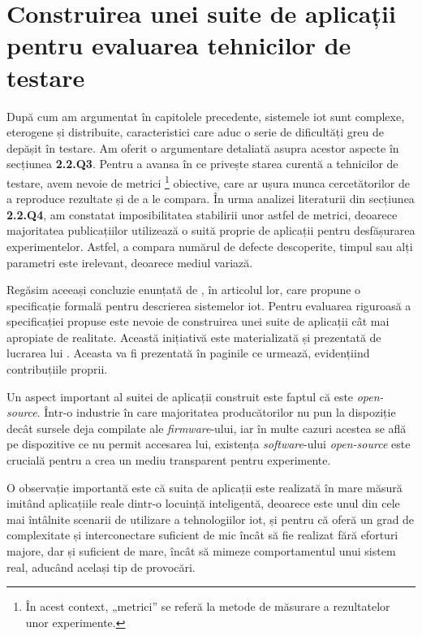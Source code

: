\chapter{Construirea unei suite de aplicații pentru evaluarea 
tehnicilor de testare}

După cum am argumentat în capitolele precedente, sistemele \acrshort{iot} sunt complexe, eterogene și distribuite, caracteristici care aduc o serie de dificultăți greu de depășit în testare. Am oferit o argumentare detaliată asupra acestor aspecte în secțiunea \textbf{2.2.Q3}. Pentru a avansa în ce privește starea curentă a tehnicilor de testare, avem nevoie de metrici \footnote{În acest context, „metrici” se referă la metode de măsurare a rezultatelor unor experimente.} obiective, care ar ușura munca cercetătorilor de a reproduce rezultate și de a le compara. În urma analizei literaturii din secțiunea \textbf{2.2.Q4}, am constatat imposibilitatea stabilirii unor astfel de metrici, deoarece majoritatea publicațiilor utilizează o suită proprie de aplicații pentru desfășurarea experimentelor. Astfel, a compara numărul de defecte descoperite, timpul sau alți parametri este irelevant, deoarece mediul variază. 

Regăsim aceeași concluzie enunțată de \citet{Paduraru2021}, în articolul lor, care propune o specificație formală pentru descrierea sistemelor \acrshort{iot}. Pentru evaluarea riguroasă a specificației propuse este nevoie de construirea unei suite de aplicații cât mai apropiate de realitate. Această inițiativă este materializată și prezentată de lucrarea lui \citet{Cristea2022}. Aceasta va fi prezentată în paginile ce urmează, evidențiind contribuțiile proprii.

Un aspect important al suitei de aplicații construit este faptul că este \textit{open-source}. Într-o industrie în care majoritatea producătorilor nu pun la dispoziție decât sursele deja compilate ale \textit{firmware}-ului, iar în multe cazuri acestea se află pe dispozitive ce nu permit accesarea lui, existența \textit{software}-ului \textit{open-source} este crucială pentru a crea un mediu transparent pentru experimente.

O observație importantă este că suita de aplicații este realizată în mare măsură imitând aplicațiile reale dintr-o locuință inteligentă, deoarece este unul din cele mai întâlnite scenarii de utilizare a tehnologiilor \acrshort{iot}, și pentru că oferă un grad de complexitate și interconectare suficient de mic încât să fie realizat fără eforturi majore, dar și suficient de mare, încât să mimeze comportamentul unui sistem real, aducând același tip de provocări.

